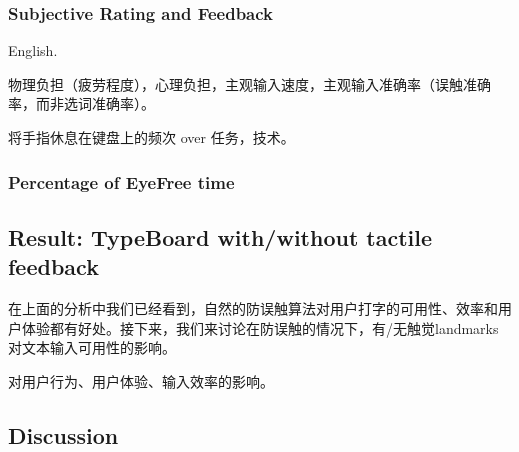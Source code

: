 \subsubsection{Subjective Rating and Feedback}

English.

物理负担（疲劳程度），心理负担，主观输入速度，主观输入准确率（误触准确率，而非选词准确率）。

将手指休息在键盘上的频次 over 任务，技术。

\subsubsection{Percentage of EyeFree time}

\subsection{Result: TypeBoard with/without tactile feedback}

在上面的分析中我们已经看到，自然的防误触算法对用户打字的可用性、效率和用户体验都有好处。接下来，我们来讨论在防误触的情况下，有/无触觉landmarks对文本输入可用性的影响。

对用户行为、用户体验、输入效率的影响。

\subsection{Discussion}

